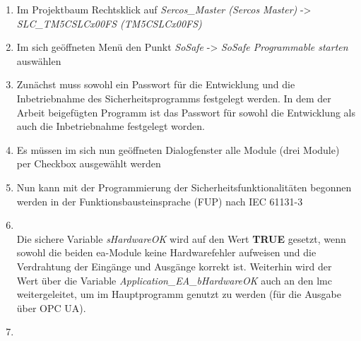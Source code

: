 \documentclass[../../../Bachelorarbeit.tex]{subfiles}
\begin{document}
\begin{enumerate}
    \item Im Projektbaum Rechtsklick auf \textit{Sercos\_Master (Sercos Master)} -> \\ \textit{SLC\_TM5CSLCx00FS (TM5CSLCx00FS)}
    \item Im sich geöffneten Menü den Punkt \textit{SoSafe} -> \textit{SoSafe Programmable starten} auswählen
    \item Zunächst muss sowohl ein Passwort für die Entwicklung und die Inbetriebnahme des Sicherheitsprogramms festgelegt werden. In dem der Arbeit beigefügten Programm ist das Passwort  für sowohl die Entwicklung als auch die Inbetriebnahme festgelegt worden.
    \item Es müssen im sich nun geöffneten Dialogfenster alle Module (drei Module) per Checkbox ausgewählt werden
    \item Nun kann mit der Programmierung der Sicherheitsfunktionalitäten begonnen werden in der Funktionsbausteinsprache (FUP) nach IEC 61131-3
    \item \begin{minipage}[t]{\linewidth}
        \raggedright
        \label{fig:my-img41}
    \end{minipage}
    \bigskip \\
    Die sichere Variable \textit{sHardwareOK} wird auf den Wert \textbf{TRUE} gesetzt, wenn sowohl die beiden \acs{ea}-Module keine Hardwarefehler aufweisen und die Verdrahtung der Eingänge und Ausgänge korrekt ist. Weiterhin wird der Wert über die Variable \textit{Application\_EA\_bHardwareOK} auch an den \acs{lmc} weitergeleitet, um im Hauptprogramm genutzt zu werden (\zB für die Ausgabe über OPC UA).
    \item \begin{minipage}[t]{\linewidth}
        \raggedright
\end{minipage}
\end{enumerate}
\end{document}
